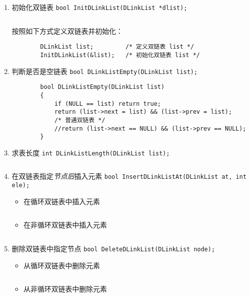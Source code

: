 \documentclass{ctexart}
\begin{document}
\begin{enumerate}
    \item 初始化双链表 \texttt{bool InitDLinkList(DLinkList *dlist);}
        \inputminted{c}{codes/init-double-link-list.c}
        按照如下方式定义双链表并初始化：
        \begin{verbatim}
        DLinkList list;         /* 定义双链表 list */
        InitDLinkList(&list);   /* 初始化双链表 list */
        \end{verbatim}

    \item 判断是否是空链表 \texttt{bool DLinkListEmpty(DLinkList list);}
        \begin{verbatim}
        bool DLinkListEmpty(DLinkList list)
        {
            if (NULL == list) return true;
            return (list->next = list) && (list->prev = list);
            /* 普通双链表 */
            //return (list->next == NULL) && (list->prev == NULL);
        }
        \end{verbatim}

    \item 求表长度 \texttt{int DLinkListLength(DLinkList list);}
        \inputminted{c}{codes/length-of-double-link-list.c}

    \item 在双链表指定\emph{节点后}插入元素 \texttt{bool InsertDLinkListAt(DLinkList at, int ele);}
        \begin{itemize}
            \item 在循环双链表中插入元素
                \inputminted{c}{codes/insert-double-cycle-link-at.c}
            \item 在非循环双链表中插入元素
                \inputminted{c}{codes/insert-double-link-at.c}
        \end{itemize}

    \item 删除双链表中指定节点 \texttt{bool DeleteDLinkList(DLinkList node);}
        \begin{itemize}
            \item 从循环双链表中删除元素
                \inputminted{c}{codes/delete-in-double-cycle-link-list.c}
            \item 从非循环双链表中删除元素
                \inputminted{c}{codes/delete-in-double-link-list.c}
        \end{itemize}

\end{enumerate}
\end{document}
